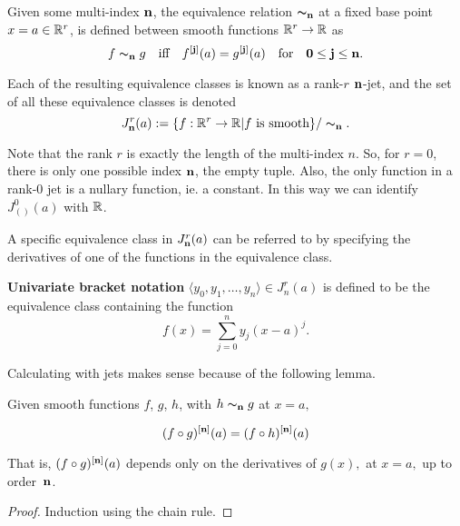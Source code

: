 \documentclass[11pt]{article}
\begin{document}
\begin{definition}
Given some multi-index $\bf n$, the equivalence relation $\thicksim_{\bf n}$ 
at a fixed base point $x=a\in\mathbb{R}^r$,
is defined between smooth functions $\mathbb{R}^r\to\mathbb{R}$ as
$$f\thicksim_{\bf n} g \quad \hbox{iff}\quad  
f^{[\bf j]}(a)=g^{[\bf j]}(a)\quad  \hbox{for}\quad  
{\bf 0}\le \bf j\le \bf n.$$

Each of the resulting equivalence classes is known as a 
rank-$r$ $\bf n$-jet, and the set of all these equivalence classes
is denoted %
$$ J^r_{\bfn}(a) := \{f:\Reals^r\to\Reals| f \ \hbox{is smooth} \}/\thicksim_{\bfn}. $$


\end{definition}
 
Note that the rank $r$ is exactly the length of the multi-index $n$.
So, for $r=0$, there is only one possible index $\bf n$, the empty tuple.
Also, the only function in a rank-$0$ jet is a nullary
function, ie. a constant.
In this way we can identify $J^0_{()}(a)$ with $\mathbb{R}$.

A specific equivalence class in $J^r_{\bf n}(a)$ can be referred to
by specifying the derivatives of one of the functions in the equivalence class.
\begin{definition} {\bf Univariate bracket notation}
$\langle y_0, y_1, \dots, y_n \rangle\in J^r_n(a)$ is defined to be
the equivalence class containing the function
$$ f(x) = \sum_{j=0}^n y_j (x-a)^j. $$
\end{definition}

Calculating with jets makes sense because of the following lemma.

\begin{lemma}
    Given smooth functions $f$, $g$, $h$, with 
$ h\thicksim_{\bf n}g$ at $x=a,$ 

    $$ (f\circ g)^{[\bf n]}(a) = (f\circ h)^{[\bf n]}(a) $$ 

That is, $(f\circ g)^{[\bf n]}(a)$ depends only on the derivatives of $g(x),$
at $x=a,$ up to order~$\bf n$.
\end{lemma}
\begin{proof}
Induction using the chain rule.
\end{proof}
\end{document}
